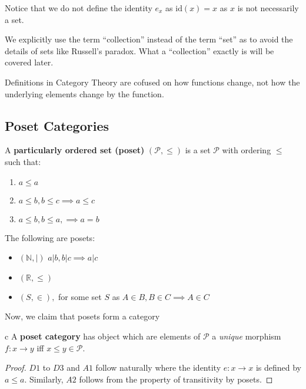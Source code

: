 \begin{remark}
    Notice that we do not define the identity $e_x$ as $\text{id}(x) = x$ as $x$ is not necessarily a set. 
\end{remark}

\begin{remark}
    We explicitly use the term ``collection'' instead of the term ``set'' as to avoid the details of sets like Russell's paradox. What a ``collection'' exactly is will be covered later.
\end{remark}
\begin{idea}
    Definitions in Category Theory are cofused on how functions change, not how the underlying elements change by the function.
\end{idea}

\subsection{Poset Categories}
\begin{definition}
A \textbf{particularly ordered set (poset)} $(\mathcal{P}, \le)$ is a set $\mathcal{P}$ with ordering $\le$ such that:
\begin{enumerate} [label=\arabic*\textrangle]
    \item $a\le a$
    \item $a\le b, b\le c \implies a \le c$
    \item $a\le b, b\le a, \implies a = b$
\end{enumerate}
\begin{example}
The following are posets:
\begin{itemize}
    \item $(\mathbb{N}, |)$ $  a|b, b|c \implies a|c$
    \item $(\mathbb{R}, \le)$
    \item $(S, \in),$ for some set $S$ as $A\in B, B\in C \implies A\in C$
\end{itemize}
\end{example}
\end{definition}

Now, we claim that posets form a category
\begin{definition} c
A \textbf{poset category} has object which are elements of $\mathcal{P}$ a \textit{unique} morphism $f:x\to y$ iff $x\le y \in \mathcal{P}.$
    
\end{definition}

\begin{proof}
$D1$ to $D3$ and $A1$ follow naturally where the identity $e: x\to x$ is defined by $a \le a.$ Similarly, $A2$ follows from the property of transitivity by posets.     
\end{proof}


